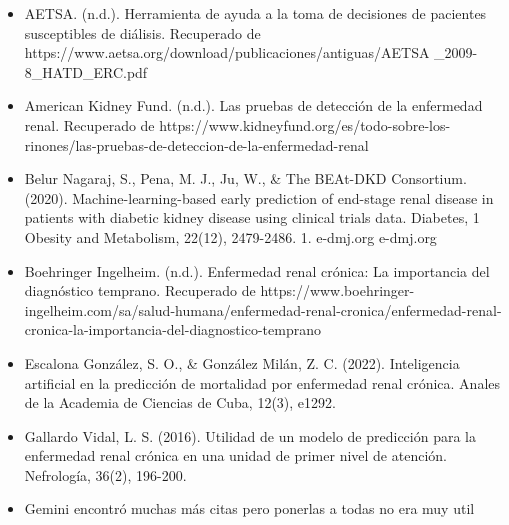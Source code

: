 \documentclass{article}
\begin{document}
\begin{itemize}
    \item AETSA. (n.d.). Herramienta de ayuda a la toma de decisiones de pacientes susceptibles de diálisis. Recuperado de https://www.aetsa.org/download/publicaciones/antiguas/AETSA
        \_2009-8\_HATD\_ERC.pdf
    \item American Kidney Fund. (n.d.). Las pruebas de detección de la enfermedad renal. Recuperado de https://www.kidneyfund.org/es/todo-sobre-los-rinones/las-pruebas-de-deteccion-de-la-enfermedad-renal
    \item Belur Nagaraj, S., Pena, M. J., Ju, W., \& The BEAt-DKD Consortium. (2020). Machine-learning-based early prediction of end-stage renal disease in patients with diabetic kidney disease using clinical trials data. Diabetes, 1  Obesity and Metabolism, 22(12), 2479-2486.  1. e-dmj.org e-dmj.org
    \item Boehringer Ingelheim. (n.d.). Enfermedad renal crónica: La importancia del diagnóstico temprano. Recuperado de https://www.boehringer-ingelheim.com/sa/salud-humana/enfermedad-renal-cronica/enfermedad-renal-cronica-la-importancia-del-diagnostico-temprano
    \item Escalona González, S. O., \& González Milán, Z. C. (2022). Inteligencia artificial en la predicción de mortalidad por enfermedad renal crónica. Anales de la Academia de Ciencias de Cuba, 12(3), e1292.
    \item Gallardo Vidal, L. S. (2016). Utilidad de un modelo de predicción para la enfermedad renal crónica en una unidad de primer nivel de atención. Nefrología, 36(2), 196-200.
    \item Gemini encontró muchas más citas pero ponerlas a todas no era muy util
\end{itemize}

\newpage
\end{document}
